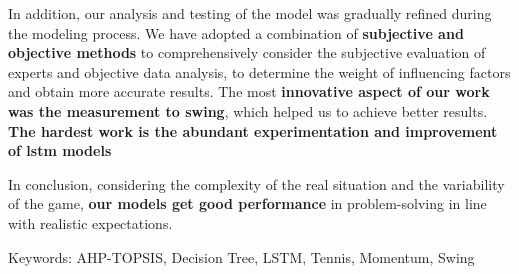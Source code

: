In addition, our analysis and testing of the model was gradually refined during the modeling process. We have adopted a combination of \textbf{subjective and objective methods} to comprehensively consider the subjective evaluation of experts and objective data analysis, to determine the weight of influencing factors and obtain more accurate results. 
The most \textbf{innovative aspect of our work was the measurement to swing}, which helped us to achieve better results. \textbf{The hardest work is the abundant experimentation and improvement of lstm models}\par

In conclusion, considering the complexity of the real situation and the variability of the game, \textbf{our models get good performance} in problem-solving in line with realistic expectations. 

\vspace{30pt}



Keywords: AHP-TOPSIS, Decision Tree, LSTM, Tennis, Momentum, Swing



